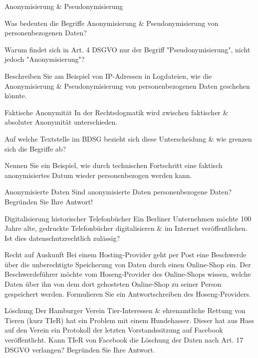 \documentclass{exercisesheet}
\begin{document}
\begin{exercise**}{Anonymisierung \& Pseudonymisierung}
  \item Was bedeuten die Begriffe Anonymisierung \& Pseudonymisierung von personenbezogenen Daten?
  \item Warum findet sich in Art. 4 DSGVO nur der Begriff "Pseudonymisierung", nicht jedoch "Anonymisierung"?
  \item Beschreiben Sie am Beispiel von IP-Adressen in Logdateien, wie die Anonymisierung \& Pseudonymisierung von personenbezogenen Daten geschehen könnte.
\end{exercise**}

\begin{exercise*}{Faktische Anonymität}{
    In der Rechtsdogmatik wird zwischen faktischer \& absoluter Anonymität unterschieden.
  }
  \item Auf welche Textstelle im BDSG bezieht sich diese Unterscheidung \& wie grenzen sich die Begriffe ab?
  \item Nennen Sie ein Beispiel, wie durch technischen Fortschritt eine faktisch anonymisiertes Datum wieder personenbezogen werden kann.
\end{exercise*}

\begin{exercise}{Anonymisierte Daten}
  Sind anonymisierte Daten personenbezogene Daten? Begründen Sie Ihre Antwort!
\end{exercise}

\begin{exercise}{Digitalisierung historischer Telefonbücher}
  Ein Berliner Unternehmen möchte 100 Jahre alte, gedruckte Telefonbücher digitalisieren \& im Internet veröffentlichen. Ist dies datenschutzrechtlich zulässig?
\end{exercise}

\begin{exercise}{Recht auf Auskunft}
  Bei einem Hosting-Provider geht per Post eine Beschwerde über die unberechtigte Speicherung von Daten durch einen Online-Shop ein. Der Beschwerdeführer möchte vom Hoseng-Provider des Online-Shops wissen, welche Daten über ihn von dem dort gehosteten Online-Shop zu seiner Person gespeichert werden. Formulieren Sie ein Antwortschreiben des Hoseng-Providers.
\end{exercise}

\begin{exercise}{Löschung}
  Der Hamburger Verein Tier-Interessen \& ehrenamtliche Rettung von Tieren (kurz TIeR) hat ein Problem mit einem Hundehasser. Dieser hat aus Hass auf den Verein ein Protokoll der letzten Vorstandssitzung auf Facebook veröffentlicht. Kann TIeR von Facebook die Löschung der Daten nach Art. 17 DSGVO verlangen? Begründen Sie Ihre Antwort.
\end{exercise}
\end{document}
